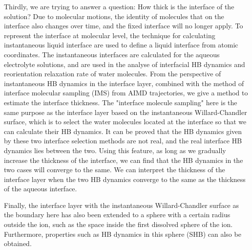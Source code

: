 Thirdly, we are trying to answer a question: How thick is the interface of the solution? 
Due to molecular motions, the identity of molecules that on the interface also changes over time\cite{Willard2010}, 
and the fixed interface will no longer apply. 
To represent the interface at molecular level, the technique for calculating instantaneous liquid interface are used to define a liquid interface from atomic coordinates.
The instantaneous interfaces are calculated for the aqueous electrolyte solutions, and are used in the analyse of interfacial HB dynamics
and reorientation relaxation rate of water molecules.
From the perspective of instantaneous HB dynamics in the interface layer, combined with the method 
of interface molecular sampling (IMS) from AIMD trajectories,
we give a method to estimate the interface thickness. The "interface molecule sampling" here is the same purpose as the interface layer 
based on the instantaneous Willard-Chandler surface, which is to select the water molecules located at the interface so that we can calculate their HB dynamics. 
It can be proved that the HB dynamics given by these two interface selection methods are not real, and the real interface HB dynamics lies between the two. 
Using this feature, as long as we gradually increase the thickness of the interface, we can find that the HB dynamics in the two cases will converge to the same. 
We can interpret the thickness of the interface layer when the two HB dynamics converge to the same as the thickness of the aqueous interface.

Finally, the interface layer with the instantaneous Willard-Chandler surface as the boundary here has also been extended to a sphere with a certain radius outside the ion, 
such as the space inside the first dissolved sphere of the ion. Furthermore, properties such as HB dynamics in this sphere (SHB) can also be obtained.



